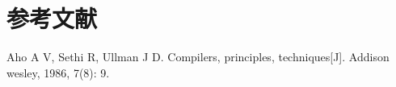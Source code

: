 \documentclass{ML}
\begin{document}
\section{参考文献}
\begin{thebibliography}{20}
     Aho A V, Sethi R, Ullman J D. Compilers, principles, techniques[J]. Addison wesley, 1986, 7(8): 9.
\end{thebibliography}
\end{document}
